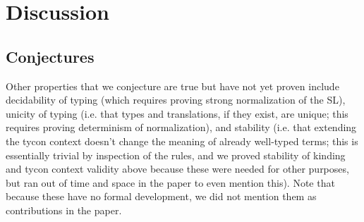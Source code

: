 \documentclass[12pt]{article}
\begin{document}
\section{Discussion}



\subsection{Conjectures}
Other properties that we conjecture are true but have not yet proven include decidability of typing (which requires proving strong normalization of the SL), unicity of typing (i.e. that types and translations, if they exist, are unique; this requires proving determinism of normalization), and stability (i.e. that extending the tycon context doesn't change the meaning of already well-typed terms; this is essentially trivial by inspection of the rules, and we proved stability of kinding and tycon context validity above because these were needed for other purposes, but ran out of time and space in the paper to even mention this). Note that because these have no formal development, we did not mention them as contributions in the paper.
\end{document}
